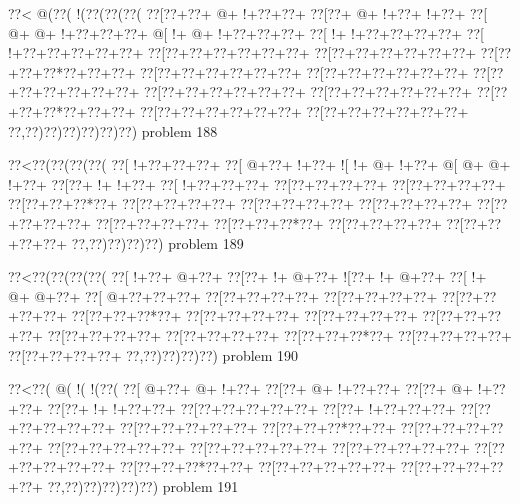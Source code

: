 \vbox{\vbox{\goo
\0??<\- @(\0??(\- !(\0??(\0??(\0??(
\0??[\0??+\0??+\- @+\- !+\0??+\0??+
\0??[\0??+\- @+\- !+\0??+\- !+\0??+
\0??[\- @+\- @+\- !+\0??+\0??+\0??+
\- @[\- !+\- @+\- !+\0??+\0??+\0??+
\0??[\- !+\- !+\0??+\0??+\0??+\0??+
\0??[\- !+\0??+\0??+\0??+\0??+\0??+
\0??[\0??+\0??+\0??+\0??+\0??+\0??+
\0??[\0??+\0??+\0??+\0??+\0??+\0??+
\0??[\0??+\0??+\0??*\0??+\0??+\0??+
\0??[\0??+\0??+\0??+\0??+\0??+\0??+
\0??[\0??+\0??+\0??+\0??+\0??+\0??+
\0??[\0??+\0??+\0??+\0??+\0??+\0??+
\0??[\0??+\0??+\0??+\0??+\0??+\0??+
\0??[\0??+\0??+\0??+\0??+\0??+\0??+
\0??[\0??+\0??+\0??*\0??+\0??+\0??+
\0??[\0??+\0??+\0??+\0??+\0??+\0??+
\0??[\0??+\0??+\0??+\0??+\0??+\0??+
\0??,\0??)\0??)\0??)\0??)\0??)\0??)
}
\hfil problem 188\hfil\break
}

\vbox{\vbox{\goo
\0??<\0??(\0??(\0??(\0??(
\0??[\- !+\0??+\0??+\0??+
\0??[\- @+\0??+\- !+\0??+
\- ![\- !+\- @+\- !+\0??+
\- @[\- @+\- @+\- !+\0??+
\0??[\0??+\- !+\- !+\0??+
\0??[\- !+\0??+\0??+\0??+
\0??[\0??+\0??+\0??+\0??+
\0??[\0??+\0??+\0??+\0??+
\0??[\0??+\0??+\0??*\0??+
\0??[\0??+\0??+\0??+\0??+
\0??[\0??+\0??+\0??+\0??+
\0??[\0??+\0??+\0??+\0??+
\0??[\0??+\0??+\0??+\0??+
\0??[\0??+\0??+\0??+\0??+
\0??[\0??+\0??+\0??*\0??+
\0??[\0??+\0??+\0??+\0??+
\0??[\0??+\0??+\0??+\0??+
\0??,\0??)\0??)\0??)\0??)
}
\hfil problem 189\hfil\break
}

\vbox{\vbox{\goo
\0??<\0??(\0??(\0??(\0??(
\0??[\- !+\0??+\- @+\0??+
\0??[\0??+\- !+\- @+\0??+
\- ![\0??+\- !+\- @+\0??+
\0??[\- !+\- @+\- @+\0??+
\0??[\- @+\0??+\0??+\0??+
\0??[\0??+\0??+\0??+\0??+
\0??[\0??+\0??+\0??+\0??+
\0??[\0??+\0??+\0??+\0??+
\0??[\0??+\0??+\0??*\0??+
\0??[\0??+\0??+\0??+\0??+
\0??[\0??+\0??+\0??+\0??+
\0??[\0??+\0??+\0??+\0??+
\0??[\0??+\0??+\0??+\0??+
\0??[\0??+\0??+\0??+\0??+
\0??[\0??+\0??+\0??*\0??+
\0??[\0??+\0??+\0??+\0??+
\0??[\0??+\0??+\0??+\0??+
\0??,\0??)\0??)\0??)\0??)
}
\hfil problem 190\hfil\break
}

\vbox{\vbox{\goo
\0??<\0??(\- @(\- !(\- !(\0??(
\0??[\- @+\0??+\- @+\- !+\0??+
\0??[\0??+\- @+\- !+\0??+\0??+
\0??[\0??+\- @+\- !+\0??+\0??+
\0??[\0??+\- !+\- !+\0??+\0??+
\0??[\0??+\0??+\0??+\0??+\0??+
\0??[\0??+\- !+\0??+\0??+\0??+
\0??[\0??+\0??+\0??+\0??+\0??+
\0??[\0??+\0??+\0??+\0??+\0??+
\0??[\0??+\0??+\0??*\0??+\0??+
\0??[\0??+\0??+\0??+\0??+\0??+
\0??[\0??+\0??+\0??+\0??+\0??+
\0??[\0??+\0??+\0??+\0??+\0??+
\0??[\0??+\0??+\0??+\0??+\0??+
\0??[\0??+\0??+\0??+\0??+\0??+
\0??[\0??+\0??+\0??*\0??+\0??+
\0??[\0??+\0??+\0??+\0??+\0??+
\0??[\0??+\0??+\0??+\0??+\0??+
\0??,\0??)\0??)\0??)\0??)\0??)
}
\hfil problem 191\hfil\break
}

